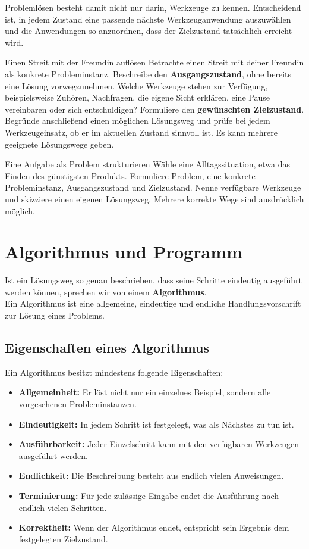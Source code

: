 \documentclass{article}
\begin{document}
Problemlösen besteht damit nicht nur darin, Werkzeuge zu kennen. Entscheidend ist, in jedem Zustand eine passende nächste Werkzeuganwendung auszuwählen und die Anwendungen so anzuordnen, dass der Zielzustand tatsächlich erreicht wird.

\begin{uebung}{Einen Streit mit der Freundin auflösen}
Betrachte einen Streit mit deiner Freundin als konkrete Probleminstanz. Beschreibe den \textbf{Ausgangszustand}, ohne bereits eine Lösung vorwegzunehmen. Welche Werkzeuge stehen zur Verfügung, beispielsweise Zuhören, Nachfragen, die eigene Sicht erklären, eine Pause vereinbaren oder sich entschuldigen? Formuliere den \textbf{gewünschten Zielzustand}. Begründe anschließend einen möglichen Lösungsweg und prüfe bei jedem Werkzeugeinsatz, ob er im aktuellen Zustand sinnvoll ist. Es kann mehrere geeignete Lösungswege geben.
\end{uebung}

\begin{uebung}{Eine Aufgabe als Problem strukturieren}
Wähle eine Alltagssituation, etwa das Finden des günstigsten Produkts. Formuliere Problem, eine konkrete Probleminstanz, Ausgangszustand und Zielzustand. Nenne verfügbare Werkzeuge und skizziere einen eigenen Lösungsweg. Mehrere korrekte Wege sind ausdrücklich möglich.
\end{uebung}


\section{Algorithmus und Programm}

Ist ein Lösungsweg so genau beschrieben, dass seine Schritte eindeutig ausgeführt werden können, sprechen wir von einem \textbf{Algorithmus}.\\
Ein Algorithmus ist eine allgemeine, eindeutige und endliche Handlungsvorschrift zur Lösung eines Problems.

\subsection{Eigenschaften eines Algorithmus}

Ein Algorithmus besitzt mindestens folgende Eigenschaften:

\begin{itemize}
  \item \textbf{Allgemeinheit:} Er löst nicht nur ein einzelnes Beispiel, sondern alle vorgesehenen Probleminstanzen.
  \item \textbf{Eindeutigkeit:} In jedem Schritt ist festgelegt, was als Nächstes zu tun ist.
  \item \textbf{Ausführbarkeit:} Jeder Einzelschritt kann mit den verfügbaren Werkzeugen ausgeführt werden.
  \item \textbf{Endlichkeit:} Die Beschreibung besteht aus endlich vielen Anweisungen.
  \item \textbf{Terminierung:} Für jede zulässige Eingabe endet die Ausführung nach endlich vielen Schritten.
  \item \textbf{Korrektheit:} Wenn der Algorithmus endet, entspricht sein Ergebnis dem festgelegten Zielzustand.
\end{itemize}
\end{document}
